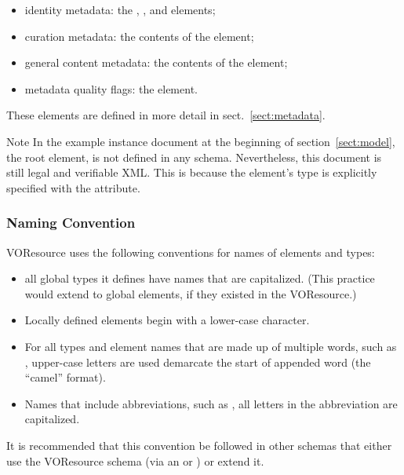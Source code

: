 \documentclass[11pt,a4paper]{ivoa}
\begin{document}
\begin{itemize}
  \item identity metadata:  the ,
       , and
        elements;
  \item curation metadata:  the contents of the
        element;
  \item general content metadata:  the contents of the
        element;
  \item metadata quality flags:  the
        element.
\end{itemize}


These elements are defined in more detail in sect.~\ref{sect:metadata}.


\begin{admonition}{Note}
In the example instance
document at the beginning of section~\ref{sect:model}, the root element,
 is not defined in any schema.
Nevertheless, this document is still legal and verifiable XML.
This is because the element's type is explicitly specified with
the  attribute.
\end{admonition}


\subsubsection{Naming Convention}

VOResource uses the following conventions for
names of elements and types:

\begin{itemize}
  \item all global types it defines have names that are capitalized.
       (This practice would extend to global elements, if they existed
       in the VOResource.)   
  \item Locally defined elements begin with a lower-case character. 
  \item For all types and element names that are made up of multiple
       words, such as , upper-case letters are
       used demarcate the start of appended word (the ``camel''
       format).  
  \item Names that include abbreviations, such as
       , all letters in the abbreviation are
       capitalized.  
\end{itemize}

It is recommended that this convention be followed in other schemas
that either use the VOResource schema (via an  or
) or extend it.  
\end{document}
